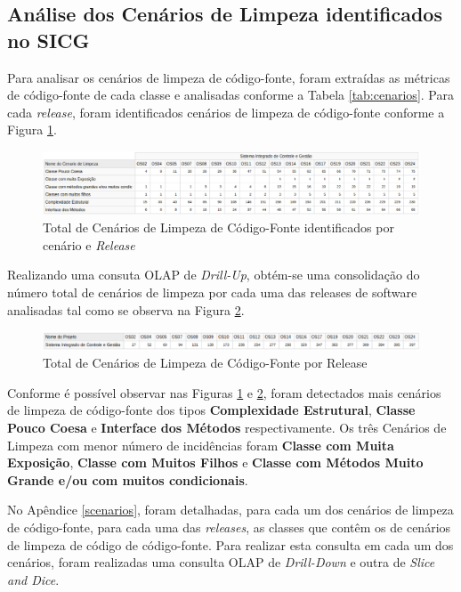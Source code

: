 \subsection{Análise dos Cenários de Limpeza identificados no SICG}

Para analisar os cenários de limpeza de código-fonte, foram extraídas as métricas de código-fonte de cada classe e analisadas conforme a Tabela \ref{tab:cenarios}. Para cada \textit{release}, foram identificados cenários de limpeza de código-fonte conforme a Figura \ref{fig:cenarios-release}.


\begin{figure}[ht!]
\centering
\includegraphics[keepaspectratio=true,scale=0.47]{figuras/total-cenario-tipo.eps}
\caption{Total de Cenários de Limpeza de Código-Fonte identificados por cenário e \textit{Release}}
\label{fig:cenarios-release}
\end{figure}
\FloatBarrier


Realizando uma consuta OLAP de \textit{Drill-Up}, obtém-se uma consolidação do número total de cenários de limpeza por cada uma das releases de software analisadas tal como se observa na Figura \ref{fig:cenarios-total}.

\begin{figure}[ht!]
\centering
\includegraphics[keepaspectratio=true,scale=0.48]{figuras/total-cenarios-release.eps}
\caption{Total de Cenários de Limpeza de Código-Fonte por Release}
\label{fig:cenarios-total}
\end{figure}
\FloatBarrier

Conforme é possível observar nas Figuras \ref{fig:cenarios-release} e \ref{fig:cenarios-total}, foram detectados mais cenários de limpeza de código-fonte dos tipos \textbf{Complexidade Estrutural}, \textbf{Classe Pouco Coesa} e \textbf{Interface dos Métodos} respectivamente. Os três Cenários de Limpeza com menor número de incidências foram \textbf{Classe com Muita Exposição}, \textbf{Classe com Muitos Filhos} e \textbf{Classe com Métodos Muito Grande e/ou com muitos condicionais}.

No Apêndice \ref{scenarios}, foram detalhadas, para cada um dos cenários de limpeza de código-fonte, para cada uma das \textit{releases}, as classes que contêm os de cenários de limpeza de código de código-fonte. Para realizar esta consulta em cada um dos cenários, foram realizadas uma consulta OLAP de \textit{Drill-Down} e outra de \textit{Slice and Dice}.

